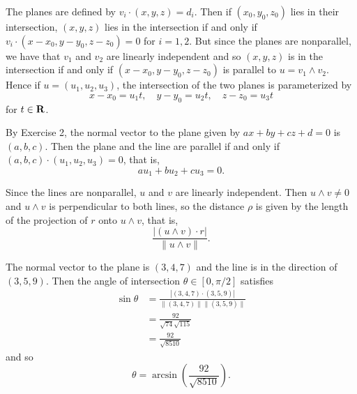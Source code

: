 \begin{ex}
The planes are defined by $v_i\cdot(x, y, z) = d_i$. Then if $(x_0, y_0, z_0)$ lies in their intersection, $(x, y, z)$ lies in the intersection if and only if $v_i\cdot(x-x_0, y-y_0, z-z_0) = 0$ for $i = 1, 2$. But since the planes are nonparallel, we have that $v_1$ and $v_2$ are linearly independent and so $(x, y, z)$ is in the intersection if and only if $(x-x_0, y-y_0, z-z_0)$ is parallel to $u = v_1\wedge v_2$. Hence if $u = (u_1, u_2, u_3)$, the intersection of the two planes is parameterized by \[x-x_0 = u_1t,\quad y-y_0 = u_2t,\quad z-z_0 = u_3t\] for $t \in \mathbf{R}$.
\end{ex}

\begin{ex}
By Exercise 2, the normal vector to the plane given by $ax + by + cz + d = 0$ is $(a, b, c)$. Then the plane and the line are parallel if and only if $(a, b, c)\cdot (u_1, u_2, u_3) = 0$, that is, \[au_1 + bu_2 + cu_3 = 0.\]
\end{ex}

\begin{ex}
Since the lines are nonparallel, $u$ and $v$ are linearly independent. Then $u\wedge v\not = 0$ and $u\wedge v$ is perpendicular to both lines, so the distance $\rho$ is given by the length of the projection of $r$ onto $u\wedge v$, that is, \[\frac{|(u\wedge v)\cdot r|}{\|u\wedge v\|}.\]
\end{ex}

\begin{ex}
The normal vector to the plane is $(3, 4, 7)$ and the line is in the direction of $(3, 5, 9)$. Then the angle of intersection $\theta \in [0, \pi/2]$ satisfies
\begin{align*}
\sin\theta & = \frac{|(3, 4, 7)\cdot (3, 5, 9)|}{\|(3, 4, 7)\|\|(3, 5, 9)\|}\\
& = \frac{92}{\sqrt{74}\sqrt{115}}\\
& = \frac{92}{\sqrt{8510}}
\end{align*}
and so \[\theta = \arcsin\left(\frac{92}{\sqrt{8510}}\right).\]
\end{ex}

\begin{ex}

\end{ex}

\begin{ex}

\end{ex}

\begin{ex}

\end{ex}

\begin{ex}

\end{ex}

\begin{ex}

\end{ex}